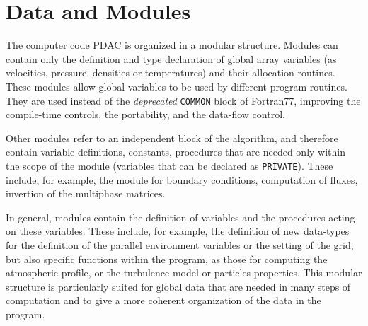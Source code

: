 \section{Data and Modules}
The computer code PDAC is organized in a modular structure.
Modules can contain only the definition and type declaration
of global array variables (as velocities, pressure, densities or
temperatures) and their allocation routines. These modules allow
global variables to be used by different program routines. They are
used instead of the {\em deprecated} {\tt COMMON} block of Fortran77, improving
the compile-time controls, the portability, and the data-flow control.

Other modules refer to an independent block of the algorithm, and therefore contain
variable definitions, constants, procedures that are needed only
within the scope of the module (variables that can be declared as {\tt PRIVATE}). 
These include, for example, the module for boundary conditions, computation 
of fluxes, invertion of the multiphase matrices.

In general, modules contain the definition of variables 
and the procedures acting on these variables. These include,
for example, the definition of new data-types for the definition of 
the parallel environment variables or the setting of the grid, but also
specific functions within the program, as those for computing the atmospheric 
profile, or the turbulence model or particles properties. 
 This modular structure is particularly suited for global
data that are needed in many steps of computation and to give a more 
coherent organization of the data in the program.

